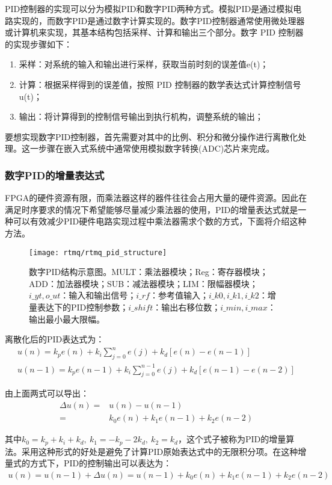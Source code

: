 PID控制器的实现可以分为模拟PID和数字PID两种方式。模拟PID是通过模拟电路实现的，而数字PID是通过数字计算实现的。数字PID控制器通常使用微处理器或计算机来实现，其基本结构包括采样、计算和输出三个部分。数字 PID 控制器的实现步骤如下：
\begin{enumerate}
    \item 采样：对系统的输入和输出进行采样，获取当前时刻的误差值e(t)；
    \item 计算：根据采样得到的误差值，按照 PID 控制器的数学表达式计算控制信号u(t)；
    \item 输出：将计算得到的控制信号输出到执行机构，调整系统的输出；
\end{enumerate}

要想实现数字PID控制器，首先需要对其中的比例、积分和微分操作进行离散化处理。这一步骤在嵌入式系统中通常使用模拟数字转换(ADC)芯片来完成。

\subsubsection[数字PID的增量表达式]{数字PID的增量表达式}
FPGA的硬件资源有限，而乘法器这样的器件往往会占用大量的硬件资源。因此在满足时序要求的情况下希望能够尽量减少乘法器的使用，PID的增量表达式就是一种可以有效减少PID硬件电路实现过程中乘法器需求个数的方式，下面将介绍这种方法。

\begin{figure}
    \centering
    \texttt{[image: rtmq/rtmq\_pid\_structure]}
    \caption[数字PID结构示意图]{数字PID结构示意图。MULT：乘法器模块；Reg：寄存器模块；ADD：加法器模块；SUB：减法器模块；LIM：限幅器模块；$i\_yt, o\_ut$：输入和输出信号；$i\_rf$：参考值输入；$i\_k0, i\_k1, i\_k2$：增量表达下的PID控制参数；$i\_shift$：输出右移位数；$i\_min, i\_max$：输出最小最大限幅。\label{fig:rtmq_pid_structure}}
\end{figure}

离散化后的PID表达式为：
\begin{align}
    u(n)=k_p e(n)+k_i\sum_{j=0}^{n}e(j)+k_d[e(n)-e(n-1)]\\
    u(n-1)=k_p e(n-1)+k_i \sum_{j=0}^{n-1}e(j)+k_d [e(n-1)-e(n-2)]
\end{align}

由上面两式可以导出：
\begin{align}
    \Delta u(n)=&u(n)-u(n-1)\\
    =&k_0 e(n)+k_1 e(n-1)+k_2 e(n-2)
\end{align}

其中$k_0=k_p+k_i+k_d,\ k_1=-k_p-2k_d,\ k_2=k_d$，这个式子被称为PID的增量算法。采用这种形式的好处是避免了计算PID原始表达式中的无限积分项。在这种增量式的方式下，PID的控制输出可以表达为：
\begin{align}
    u(n)=u(n-1)+\Delta u(n)=u(n-1)+k_0 e(n)+k_1 e(n-1)+k_2 e(n-2)\label{eq:increment_pid}
\end{align}

